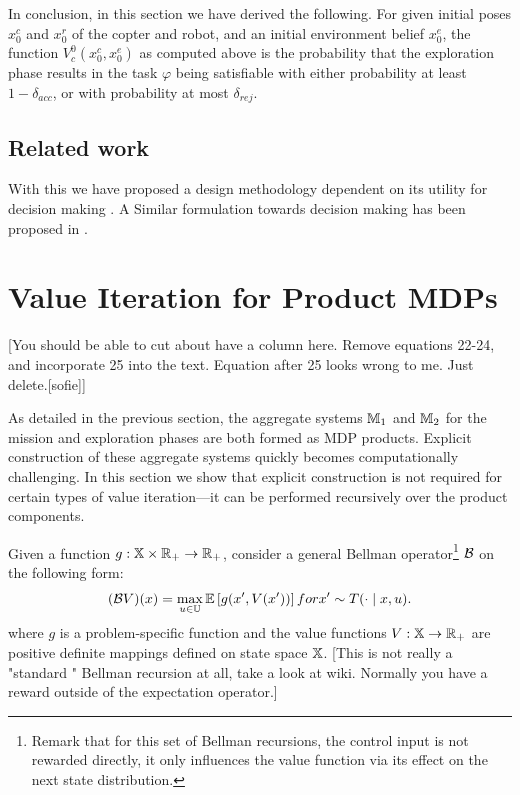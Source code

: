 \documentclass[conference]{IEEEtran}
\renewcommand{\cite}[1]{\citep{#1}}
\newcommand{\red}[1]{{\color{red} #1 }}
\newcommand{\sofie}[1]{{\color{orange}#1}}
\newcommand{\sofieNew}[1]{{\color{blue}#1}}
\begin{document}
In conclusion, in this section we have derived the following. For given initial poses $x^c_0$ and $x^r_0$ of the copter and robot, and an initial environment belief $x^e_0$, the function $V^0_c(x^c_0, x^e_0)$ as computed above is the probability that the exploration phase results in the task $\varphi$ being satisfiable with either probability at least $1- \delta_{acc}$, or with probability at most $\delta_{rej}$.
\subsection{Related work}
\sofieNew{With this we have proposed a design methodology dependent on  its utility for decision making \cite{lindley2000philosophy}. A Similar formulation towards decision making   has been proposed in \cite{haesaert2016experiment}.}

\section{ Value Iteration for Product MDPs}
\label{sec:valueiter}


\red{[You should be able to cut about have a column here. Remove equations 22-24, and incorporate 25 into the text. Equation after 25 looks wrong to me. Just delete.[sofie]]}

As detailed in the previous section, the aggregate systems $\mathbb{M}_1$ and $\mathbb{M}_2$ for the mission and exploration phases are both formed as MDP products. Explicit construction of these aggregate systems quickly becomes computationally challenging. In this section we show that explicit construction is not required for certain types of value iteration---it can be performed recursively over the product components.

Given a function $g: \mathbb{X} \times \mathbb{R}_+ \rightarrow \mathbb{R}_+$, consider a general Bellman operator\footnote{\sofieNew{Remark that for this set of Bellman recursions, the control input is not rewarded directly, it only influences the value function via its effect on the next state distribution.   }} $\mathcal{B}$ on the following form:
%
\sofieNew{
 \begin{equation}
   (\mathcal{B} V) (x) =  \max_{u \in \mathbb{U}}\mathbb E \left[ g(x', V(x')) \right]  \relax{ for } x'\sim  T(\cdot \mid x, u).
 \end{equation}
 where $g$ %
 is a problem-specific function and the value functions $V:\mathbb{X}\rightarrow \mathbb{R}_+$ are positive definite mappings defined on state space $\mathbb{X}$.
\sofie{[This is not really a "standard " Bellman recursion at all, take a look at wiki. Normally you have a reward outside of the expectation operator.]}}
\end{document}
